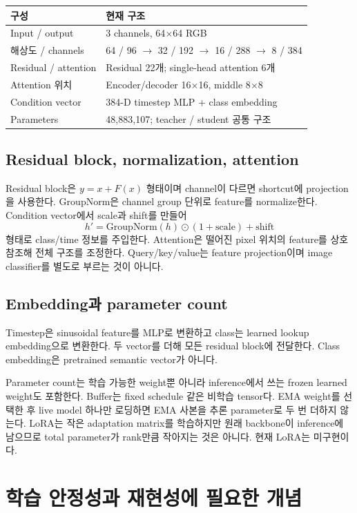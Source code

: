 \documentclass[11pt,a4paper]{article}
\begin{document}
\par\noindent
\begin{tabularx}{\linewidth}{lY}
\toprule 구성 & 현재 구조 \\\midrule
Input / output & 3 channels, 64$\times$64 RGB \\
해상도 / channels & 64 / 96 $\to$ 32 / 192 $\to$ 16 / 288 $\to$ 8 / 384 \\
Residual / attention & Residual 22개; single-head attention 6개 \\
Attention 위치 & Encoder/decoder 16$\times$16, middle 8$\times$8 \\
Condition vector & 384-D timestep MLP + class embedding \\
Parameters & 48,883,107; teacher / student 공통 구조 \\
\bottomrule
\end{tabularx}
\par

\subsection{Residual block, normalization, attention}
Residual block은 $y=x+F(x)$ 형태이며 channel이 다르면 shortcut에 projection을 사용한다. GroupNorm은 channel group 단위로 feature를 normalize한다. Condition vector에서 scale과 shift를 만들어
\[
h'=\mathrm{GroupNorm}(h)\odot(1+\mathrm{scale})+\mathrm{shift}
\]
형태로 class/time 정보를 주입한다. Attention은 떨어진 pixel 위치의 feature를 상호 참조해 전체 구조를 조정한다. Query/key/value는 feature projection이며 image classifier를 별도로 부르는 것이 아니다.

\subsection{Embedding과 parameter count}
Timestep은 sinusoidal feature를 MLP로 변환하고 class는 learned lookup embedding으로 변환한다. 두 vector를 더해 모든 residual block에 전달한다. Class embedding은 pretrained semantic vector가 아니다.

Parameter count는 학습 가능한 weight뿐 아니라 inference에서 쓰는 frozen learned weight도 포함한다. Buffer는 fixed schedule 같은 비학습 tensor다. EMA weight를 선택한 후 live model 하나만 로딩하면 EMA 사본을 추론 parameter로 두 번 더하지 않는다. LoRA는 작은 adaptation matrix를 학습하지만 원래 backbone이 inference에 남으므로 total parameter가 rank만큼 작아지는 것은 아니다. 현재 LoRA는 미구현이다.

\section{학습 안정성과 재현성에 필요한 개념}
\end{document}
